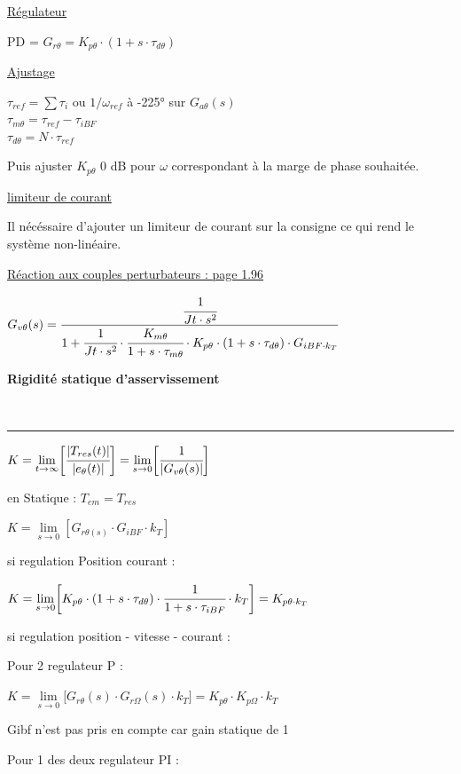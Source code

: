 \documentclass[	DIV=calc,%
							paper=a4,%
							fontsize=10pt,%
							twocolumn]{scrartcl} %
\newcounter{mycounter}
\newcommand{\formdesc}[1]{\large\textbf{#1} \addtocounter{mycounter}{1} \hfill \themycounter \\ \vspace{-3mm} \hrule \vspace{2mm}}
\newcommand{\formtitle}[1]{\large\underline{#1}}
\begin{document}
\underline{Régulateur}

PD = $G_{r\theta} = K_{p\theta} \cdot (1+s\cdot\tau_{d\theta})$

\underline{Ajustage}

$\tau_{ref} = \sum\tau_i \text{ ou } 1/\omega_{ref} $ à -225° sur $G_{a\theta}(s) $\\

$\tau_{m\theta} = \tau_{ref} - \tau_{iBF}$\\

$\tau_{d\theta} = N \cdot \tau_{ref}$

Puis ajuster $K_{p\theta}$ 0 dB pour $\omega$
correspondant à la marge de phase souhaitée.

\newpage

\underline{limiteur de courant}

Il nécéssaire d'ajouter un limiteur de courant sur la consigne ce qui rend le système non-linéaire.


\formtitle{Réaction aux couples perturbateurs : page 1.96}

\resizebox{.5\textwidth}{!}
{
$G_{v\theta}(s) = \cfrac{\cfrac{1}{Jt \cdot s^2}}{1+\cfrac{1}{Jt \cdot s^2}\cdot \cfrac{K_{m\theta}}{1+s\cdot\tau_{m\theta}} \cdot K_{p\theta} \cdot (1+s\cdot\tau_{d\theta}) \cdot G_{iBF\cdot k_T}}$
}


\formdesc{Rigidité statique d’asservissement}

$K = \lim\limits_{t \rightarrow \infty} \biggl[\cfrac{|T_{res}(t)|}{|e_\theta(t)|}\biggr] = \lim\limits_{s \rightarrow 0} \biggl[\cfrac{1}{|G_{v\theta}(s)|}\biggr]$


en Statique : 
$T_{em} = T_{res}$

$K = \lim\limits_{s \rightarrow 0}[G_{r\theta(s)}\cdot G_{iBF}\cdot k_T]$

si regulation Position courant : 

$K = \lim\limits_{s \rightarrow 0}\biggl[K_{p\theta} \cdot (1+s\cdot\tau_{d\theta}) \cdot \cfrac{1}{1+s\cdot\tau_{iBF}} \cdot k_T\biggr] = K_{p\theta \cdot k_T}$

si regulation position - vitesse - courant : 

Pour 2 regulateur P :

$K = \lim\limits_{s \rightarrow 0}\biggl[G_{r\theta}(s) \cdot G_{r\Omega}(s) \cdot k_T\biggr] = K_{p\theta }\cdot K_{p\Omega} \cdot k_T$

Gibf n'est pas pris en compte car gain statique de 1 


Pour 1 des deux regulateur PI :
\end{document}
